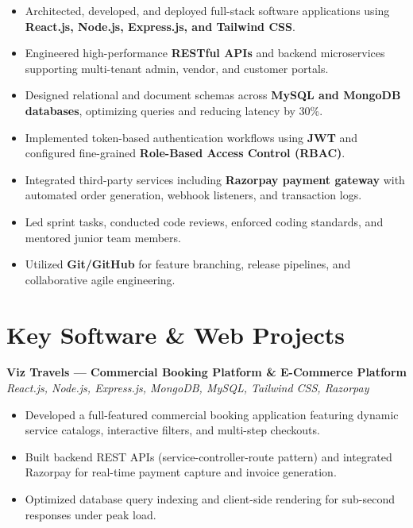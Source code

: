\documentclass[a4paper,10pt]{article}
\begin{document}
\begin{itemize}

    \item Architected, developed, and deployed full-stack software applications using \textbf{React.js, Node.js, Express.js, and Tailwind CSS}.

    \item Engineered high-performance \textbf{RESTful APIs} and backend microservices supporting multi-tenant admin, vendor, and customer portals.

    \item Designed relational and document schemas across \textbf{MySQL and MongoDB databases}, optimizing queries and reducing latency by 30\%.

    \item Implemented token-based authentication workflows using \textbf{JWT} and configured fine-grained \textbf{Role-Based Access Control (RBAC)}.

    \item Integrated third-party services including \textbf{Razorpay payment gateway} with automated order generation, webhook listeners, and transaction logs.

    \item Led sprint tasks, conducted code reviews, enforced coding standards, and mentored junior team members.

    \item Utilized \textbf{Git/GitHub} for feature branching, release pipelines, and collaborative agile engineering.

\end{itemize}

\section*{Key Software & Web Projects}

\textbf{Viz Travels --- Commercial Booking Platform \& E-Commerce Platform}
\hfill
\textit{React.js, Node.js, Express.js, MongoDB, MySQL, Tailwind CSS, Razorpay}

\begin{itemize}

    \item Developed a full-featured commercial booking application featuring dynamic service catalogs, interactive filters, and multi-step checkouts.

    \item Built backend REST APIs (service-controller-route pattern) and integrated Razorpay for real-time payment capture and invoice generation.

    \item Optimized database query indexing and client-side rendering for sub-second responses under peak load.

\end{itemize}
\end{document}
